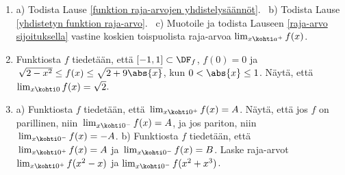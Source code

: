 \Harj
\begin{enumerate}

\item \label{H-V-2: todistuksia}
a) Todista Lause \ref{funktion raja-arvojen yhdistelysäännöt}. \
b) Todista Lause \ref{yhdistetyn funktion raja-arvo}. \
c) Muotoile ja todista Lauseen \ref{raja-arvo sijoituksella} vastine koskien toispuolista
raja-arvoa $\lim_{x \kohti a^+} f(x)$.

\item
Funktiosta $f$ tiedetään, että $[-1,1]\subset\DF_f$, $f(0)=0$ ja 
$\,\sqrt{2-x^2} \le f(x) \le \sqrt{2+9\abs{x}}$, kun $0 < \abs{x} \le 1$. Näytä, että
$\lim_{x \kohti 0}f(x)=\sqrt{2}$.

\item
a) Funktiosta $f$ tiedetään, että $\,\lim_{x \kohti 0^+}f(x)=A$. Näytä, että jos $f$ on 
parillinen, niin $\,\lim_{x \kohti 0^-}f(x)=A$, ja jos pariton, niin
$\,\lim_{x \kohti 0^-}f(x)=-A$. \newline
b) Funktiosta $f$ tiedetään, että $\,\lim_{x \kohti 0^+}f(x)=A$ ja
$\,\lim_{x \kohti 0^-}f(x)=B$. Laske raja-arvot $\lim_{x \kohti 0^+} f(x^2-x)$ ja
$\lim_{x \kohti 0^-} f(x^2+x^3)$. 


\end{enumerate}

